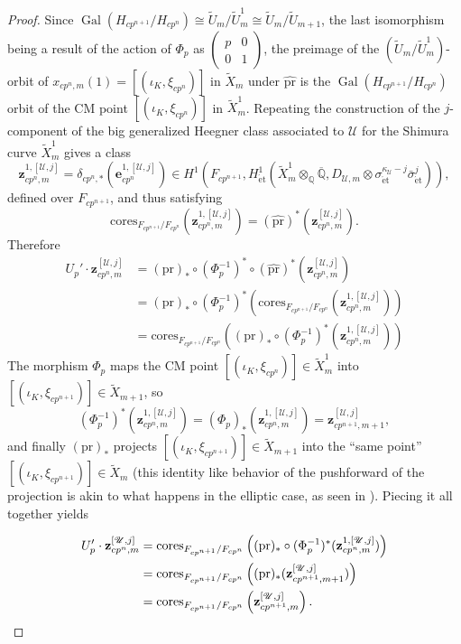 \documentclass[a4paper]{amsart}
\numberwithin{equation}{section}
\theoremstyle{definition}
\newcommand{\Q}{\mathbb{Q}}
\DeclareMathOperator{\Gal}{Gal}
\DeclareMathOperator{\et}{\text{\'et}}
\newcommand{\cores}{\mathrm{cores}}
\renewcommand{\et}{\mathrm{\acute{e}t}}
\begin{document}
\begin{proof}
Since $\Gal(H_{cp^{n+1}}/H_{cp^n})\cong \widetilde{U}_m/\widetilde{U}_m^1\cong \widetilde{U}_m/\widetilde{U}_{m+1}$, the last isomorphism being a result of the action of $\Phi_p$ as $\left(\begin{smallmatrix}p & 0 \\ 0 & 1\end{smallmatrix}\right)$, the preimage of the $(\widetilde{U}_m/\widetilde{U}_m^1)$-orbit of $x_{cp^n,m}(1)=[(\iota_K,\xi_{cp^n})]$ in $\widetilde{X}_m$ under $\hat{\mathrm{pr}}$ is the $\Gal(H_{cp^{n+1}}/H_{cp^n})$ orbit of the CM point $[(\iota_K,\xi_{cp^n})]$ in $\widetilde{X}_m^1$. Repeating the construction of the $j$-component of the big generalized Heegner class associated to $\mathscr{U}$ for the Shimura curve $\widetilde{X}_m^1$ gives a class \[\mathbf{z}^{1,[\mathscr{U},j]}_{cp^n,m}=\delta_{cp^n,*}(\mathbf{e}^{1,[\mathscr{U},j]}_{cp^n})\in H^1\left(F_{cp^{n+1}},H^1_{\et}(\widetilde{X}_m^1\otimes_{\Q}\overline{\Q}, D_{\mathscr{U},m}\otimes\sigma_{\et}^{\kappa_\mathscr{U}-j}\bar{\sigma}_{\et}^j)\right),\] defined over $F_{cp^{n+1}}$, and thus satisfying \[\cores_{F_{cp^{n+1}}/F_{cp^n}}(\mathbf{z}^{1,[\mathscr{U},j]}_{cp^n,m})=(\hat{\mathrm{pr}})^*(\mathbf{z}^{[\mathscr{U},j]}_{cp^n,m}).\] Therefore
\begin{align*}
U_p'\cdot\mathbf{z}_{cp^{n},m}^{[\mathscr{U},j]}&=({\mathrm{pr}})_*\circ(\Phi_p^{-1})^*\circ(\hat{\mathrm{pr}})^*(\mathbf{z}^{[\mathscr{U},j]}_{cp^n,m})\\
&=({\mathrm{pr}})_*\circ(\Phi_p^{-1})^*(\cores_{F_{cp^{n+1}}/F_{cp^n}}(\mathbf{z}^{1,[\mathscr{U},j]}_{cp^n,m}))\\
&=\cores_{F_{cp^{n+1}}/F_{cp^n}}\left(({\mathrm{pr}})_*\circ(\Phi_p^{-1})^*(\mathbf{z}^{1,[\mathscr{U},j]}_{cp^n,m})\right)
\end{align*}
The morphism $\Phi_p$ maps the CM point $[(\iota_K,\xi_{cp^n})]\in \widetilde{X}_m^1$ into $[(\iota_K,\xi_{cp^{n+1}})]\in \widetilde{X}_{m+1}$, so \[(\Phi_p^{-1})^*(\mathbf{z}^{1,[\mathscr{U},j]}_{cp^n,m})=(\Phi_p)_*(\mathbf{z}^{1,[\mathscr{U},j]}_{cp^n,m})=\mathbf{z}^{[\mathscr{U},j]}_{cp^{n+1},m+1},\] and finally $(\mathrm{pr})_*$ projects $[(\iota_K,\xi_{cp^{n+1}})]\in \widetilde{X}_{m+1}$ into the ``same point'' $[(\iota_K,\xi_{cp^{n+1}})]\in \widetilde{X}_{m}$ (this identity like behavior of the pushforward of the projection is akin to what happens in the elliptic case, as seen in \cite[\S 2.4]{KingsLoefflerZerbes.ERL}). Piecing it all together yields

\begin{align*}
U_p'\cdot\mathbf{z}_{cp^{n},m}^{[\mathscr{U},j]}&=\cores_{F_{cp^{n+1}}/F_{cp^n}}\left(({\mathrm{pr}})_*\circ(\Phi_p^{-1})^*(\mathbf{z}^{1,[\mathscr{U},j]}_{cp^n,m})\right)\\
&=\cores_{F_{cp^{n+1}}/F_{cp^n}}\left(({\mathrm{pr}})_*(\mathbf{z}^{[\mathscr{U},j]}_{cp^{n+1},m+1})\right)\\
&=\cores_{F_{cp^{n+1}}/F_{cp^n}}\left(\mathbf{z}^{[\mathscr{U},j]}_{cp^{n+1},m}\right).\qedhere
\end{align*}
\end{proof}
\end{document}
